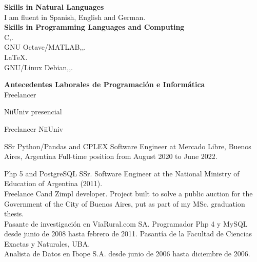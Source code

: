 \textbf{Skills in Natural Languages}\\[6pt]
I am fluent in Spanish, English and German.\\[3pt]

\textbf{Skills in Programming Languages and Computing}\\[6pt]
C\masmas,\;.\\[4pt]
{GNU Octave/MATLAB},\;,\;.\\[4pt]
{LaTeX}.\\[4pt] 
{GNU/Linux Debian},\;,\;.


\textbf{Antecedentes Laborales de Programaci\'on e Inform\'atica}\\[6pt]

Freelancer

NiiUniv presencial

Freelancer NiiUniv

SSr Python/Pandas and CPLEX Software Engineer at Mercado Libre, Buenos Aires, Argentina 
Full-time position from August 2020 to June 2022. 

Php 5 and PostgreSQL SSr. Software Engineer at the
National Ministry of Education of Argentina (2011).\\[4pt]

Freelance C\masmas and Zimpl developer. Project built to solve a public
auction for the Government of the City of Buenos Aires, put as part of my
MSc. graduation thesis.\\[4pt]

Pasante de investigaci\'on en ViaRural.com SA. Programador
Php 4 y MySQL desde junio de 2008 
hasta febrero de 2011. Pasant\'ia de la Facultad de Ciencias Exactas y Naturales, UBA.\\[4pt]
Analista de Datos en Ibope S.A. desde junio de 2006 hasta diciembre de 2006.

